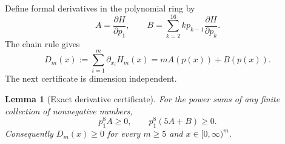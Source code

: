 \documentclass[11pt,a4paper]{article}
\newtheorem{lemma}[theorem]{Lemma}
\theoremstyle{definition}
\theoremstyle{remark}
\numberwithin{equation}{section}
\begin{document}
Define formal derivatives in the polynomial ring by
\begin{equation}\label{eq:AB}
 A=\frac{\partial H}{\partial p_1},\qquad
 B=\sum_{k=2}^{16}k p_{k-1}\frac{\partial H}{\partial p_k}.
\end{equation}
The chain rule gives
\begin{equation}\label{eq:directional-deficit}
 D_m(x):=\sum_{i=1}^m\partial_{x_i}H_m(x)
       =mA(p(x))+B(p(x)).
\end{equation}
The next certificate is dimension independent.

\begin{lemma}[Exact derivative certificate]\label{lem:derivative-cert}
For the power sums of any finite collection of nonnegative numbers,
\begin{equation}\label{eq:derivative-cert}
 p_1^8A\ge0,\qquad p_1^8(5A+B)\ge0.
\end{equation}
Consequently $D_m(x)\ge0$ for every $m\ge5$ and
$x\in[0,\infty)^m$.
\end{lemma}
\end{document}
